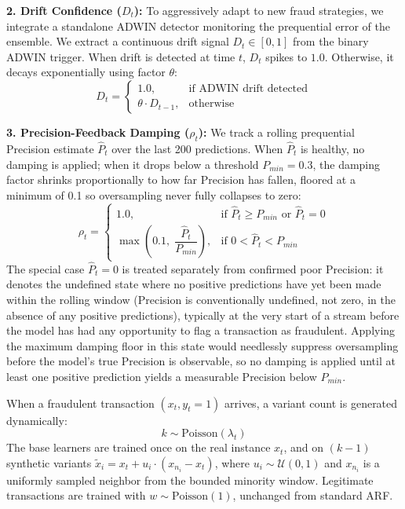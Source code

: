 \documentclass[review,12pt]{elsarticle}
\begin{document}
\textbf{2. Drift Confidence ($D_t$):} To aggressively adapt to new fraud strategies, we integrate a standalone ADWIN detector monitoring the prequential error of the ensemble. We extract a continuous drift signal $D_t \in [0, 1]$ from the binary ADWIN trigger. When drift is detected at time $t$, $D_t$ spikes to $1.0$. Otherwise, it decays exponentially using factor $\theta$:
\begin{equation}
    D_t =
    \begin{cases}
      1.0, & \text{if ADWIN drift detected} \\
      \theta \cdot D_{t-1}, & \text{otherwise}
    \end{cases}
\end{equation}

\textbf{3. Precision-Feedback Damping ($\rho_t$):} We track a rolling prequential Precision estimate $\hat{P}_t$ over the last 200 predictions. When $\hat{P}_t$ is healthy, no damping is applied; when it drops below a threshold $P_{min}=0.3$, the damping factor shrinks proportionally to how far Precision has fallen, floored at a minimum of 0.1 so oversampling never fully collapses to zero:
\begin{equation}
    \rho_t =
    \begin{cases}
      1.0, & \text{if } \hat{P}_t \geq P_{min} \text{ or } \hat{P}_t = 0\\
      \max\left(0.1,\; \dfrac{\hat{P}_t}{P_{min}}\right), & \text{if } 0 < \hat{P}_t < P_{min}
    \end{cases}
\end{equation}
The special case $\hat{P}_t=0$ is treated separately from confirmed poor Precision: it denotes the undefined state where no positive predictions have yet been made within the rolling window (Precision is conventionally undefined, not zero, in the absence of any positive predictions), typically at the very start of a stream before the model has had any opportunity to flag a transaction as fraudulent. Applying the maximum damping floor in this state would needlessly suppress oversampling before the model's true Precision is observable, so no damping is applied until at least one positive prediction yields a measurable Precision below $P_{min}$.

When a fraudulent transaction $(x_t, y_t{=}1)$ arrives, a variant count is generated dynamically:
\begin{equation}
    k \sim \text{Poisson}(\lambda_t)
\end{equation}
The base learners are trained once on the real instance $x_t$, and on $(k-1)$ synthetic variants $\tilde{x}_i = x_t + u_i \cdot (x_{n_i} - x_t)$, where $u_i \sim \mathcal{U}(0,1)$ and $x_{n_i}$ is a uniformly sampled neighbor from the bounded minority window. Legitimate transactions are trained with $w \sim \text{Poisson}(1)$, unchanged from standard ARF.
\end{document}
